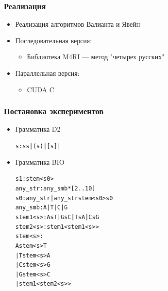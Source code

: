 \documentclass{beamer}
\begin{document}
\begin{frame}
  \transwipe[direction=90]
  \frametitle{Реализация}
  \begin{itemize}
    \item Реализация алгоритмов Валианта и Явейн
    \item Последовательная версия:
    \begin{itemize}
        \item Библиотека M4RI --- метод "четырех русских"
    \end{itemize}
    \item Параллельная версия:
    \begin{itemize}
        \item CUDA C
    \end{itemize}
    \end{itemize}
\end{frame}

\begin{frame}[fragile] \frametitle{Постановка экспериментов}

\begin{itemize}
    \item Грамматика D2

\small
\begin{alltt}
        s: s s | ( s ) | [ s ] | \varepsilon
\end{alltt}

\item Грамматика BIO

\small
\begin{alltt}
        s1: stem<s0>
        any_str: any_smb*[2..10]
        s0: any_str | any_str stem<s0> s0
        any_smb: A | T | C | G
        stem1<s>: A s T | G s C | T s A | C s G 
        stem2<s>: stem1<stem1<s>>
        stem<s>:  
              A stem<s> T 
            | T stem<s> A 
            | C stem<s> G 
            | G stem<s> C 
            | stem1<stem2<s>>  
\end{alltt}

\end{itemize}

\end{frame}
\end{document}
